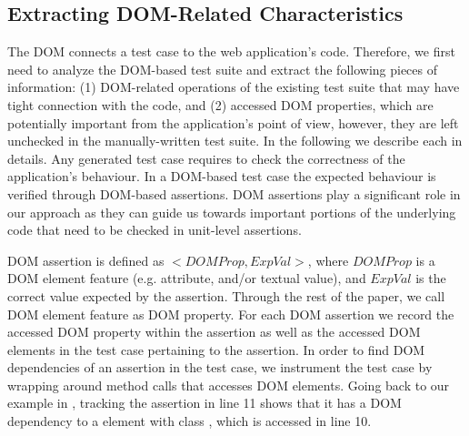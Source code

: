 \subsection{Extracting DOM-Related Characteristics} \label{Sec:extractDomRelatedInfo}
The DOM connects a test case to the web application's \javascript code. Therefore, we first need to analyze the DOM-based test suite and extract the following pieces of information: (1) DOM-related operations of the existing test suite that may have tight connection with the \javascript code, and (2) accessed DOM properties, which are potentially important from the application's point of view, however, they are left unchecked in the manually-written test suite. In the following we describe each in details.
Any generated test case requires to check the correctness of the application's behaviour. In a DOM-based test case the expected behaviour is verified through DOM-based assertions. 
DOM assertions play a significant role in our approach as they can guide us towards important portions of the underlying \javascript code that need to be checked in unit-level assertions.

DOM assertion is defined as $<DOMProp,ExpVal>$, where $DOMProp$ is a DOM element feature (e.g. attribute, and/or textual value), and $ExpVal$ is the correct value expected by the assertion. Through the rest of the paper, we call DOM element feature as DOM property.
For each DOM assertion we record the accessed DOM property within the assertion as well as the accessed DOM elements in the test case pertaining to the assertion. 
In order to find DOM dependencies of an assertion in the test case, we instrument the test case by wrapping around method calls that accesses DOM elements.
Going back to our example in , tracking the assertion in line 11 shows that it has a DOM dependency to a  element with class , which is accessed in line 10.   
 
